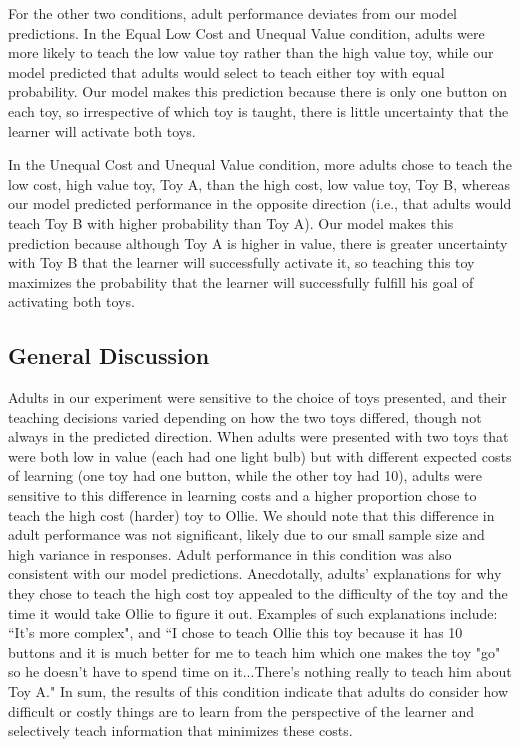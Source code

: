 \documentclass[10pt,letterpaper]{article}
\begin{document}
For the other two conditions, adult performance deviates from our model predictions. In the Equal Low Cost and Unequal Value condition, adults were more likely to teach the low value toy rather than the high value toy, while our model predicted that adults would select to teach either toy with equal probability. Our model makes this prediction because there is only one button on each toy, so irrespective of which toy is taught, there is little uncertainty that the learner will activate both toys.

In the Unequal Cost and Unequal Value condition, more adults chose to teach the low cost, high value toy, Toy A, than the high cost, low value toy, Toy B, whereas our model predicted performance in the opposite direction (i.e., that adults would teach Toy B with higher probability than Toy A). Our model makes this prediction because although Toy A is higher in value, there is greater uncertainty with Toy B that the learner will successfully activate it, so teaching this toy maximizes the probability that the learner will successfully fulfill his goal of activating both toys.

\subsection{General Discussion}

Adults in our experiment were sensitive to the choice of toys presented, and their teaching decisions varied depending on how the two toys differed, though not always in the predicted direction. When adults were presented with two toys that were both low in value (each had one light bulb) but with different expected costs of learning (one toy had one button, while the other toy had 10), adults were sensitive to this difference in learning costs and a higher proportion chose to teach the high cost (harder) toy to Ollie. We should note that this difference in adult performance was not significant, likely due to our small sample size and high variance in responses. Adult performance in this condition was also consistent with our model predictions. Anecdotally, adults' explanations for why they chose to teach the high cost toy appealed to the difficulty of the toy and the time it would take Ollie to figure it out. Examples of such explanations include: ``It's more complex", and ``I chose to teach Ollie this toy because it has 10 buttons and it is much better for me to teach him which one makes the toy "go" so he doesn't have to spend time on it...There's nothing really to teach him about Toy A." In sum, the results of this condition indicate that adults do consider how difficult or costly things are to learn from the perspective of the learner and selectively teach information that minimizes these costs. 
\end{document}
